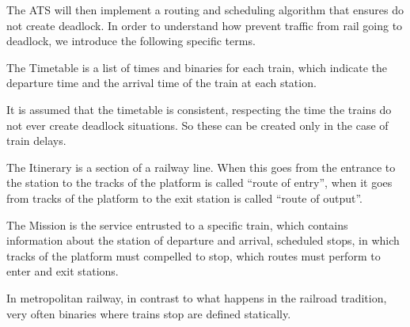 \documentclass{ewic}
\begin{document}
The ATS will then implement a routing and scheduling algorithm that ensures do not create deadlock. In order to understand how prevent traffic from rail going to deadlock, we introduce the following specific terms.


The Timetable is a list of times and binaries for each train, which indicate the departure time and the arrival time of the train at each station.

It is assumed that the timetable is consistent, respecting the time the trains do not ever create deadlock situations. So these can be created only in the case of train delays.


The Itinerary is a section of a railway line. When this goes from the entrance to the station to the tracks of the platform is called ``route of entry'', when it goes from tracks of the platform to the exit station is called ``route of output''.


The Mission is the service entrusted to a specific train, which contains information about the station of departure and arrival, scheduled stops, in which tracks of the platform must compelled to stop, which routes must perform to enter and exit stations.
 


In metropolitan railway, in contrast to what happens in the railroad tradition, very often binaries where trains stop are defined statically.
 
\end{document}
